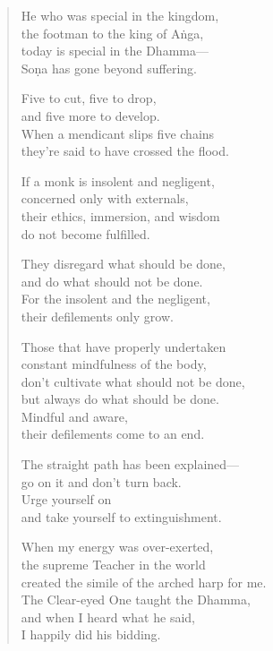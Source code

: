 \documentclass[12pt,openany]{book}%
\begin{document}
\begin{verse}%
He who was special in the kingdom, \\
the footman to the king of \textsanskrit{Aṅga}, \\
today is special in the Dhamma—\\
\textsanskrit{Soṇa} has gone beyond suffering. 

Five to cut, five to drop, \\
and five more to develop. \\
When a mendicant slips five chains \\
they’re said to have crossed the flood. 

If a monk is insolent and negligent, \\
concerned only with externals, \\
their ethics, immersion, and wisdom \\
do not become fulfilled. 

They disregard what should be done, \\
and do what should not be done. \\
For the insolent and the negligent, \\
their defilements only grow. 

Those that have properly undertaken \\
constant mindfulness of the body, \\
don’t cultivate what should not be done, \\
but always do what should be done. \\
Mindful and aware, \\
their defilements come to an end. 

The straight path has been explained—\\
go on it and don’t turn back. \\
Urge yourself on \\
and take yourself to extinguishment. 

When my energy was over-exerted, \\
the supreme Teacher in the world \\
created the simile of the arched harp for me. \\
The Clear-eyed One taught the Dhamma, \\
and when I heard what he said, \\
I happily did his bidding. 


\end{verse}
\end{document}
